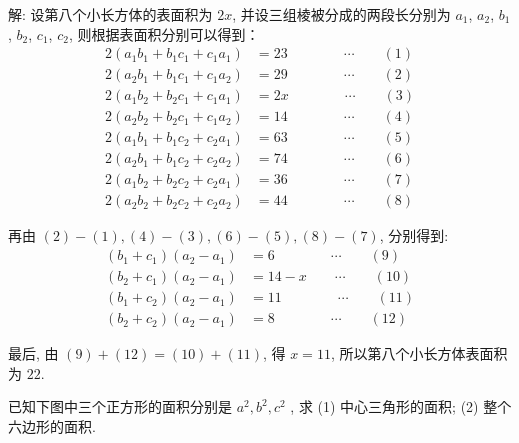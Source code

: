 解: 设第八个小长方体的表面积为 $2x$, 并设三组棱被分成的两段长分别为 $a_1$, $a_2$, $b_1$, $b_2$, $c_1$, $c_2$, 则根据表面积分别可以得到：
\begin{align*}
2(a_1b_1 + b_1c_1 + c_1a_1) &= 23 \qquad\qquad\cdots\qquad (1)\\
2(a_2b_1 + b_1c_1 + c_1a_2) &= 29 \qquad\qquad\cdots\qquad (2)\\
2(a_1b_2 + b_2c_1 + c_1a_1) &= 2x \qquad\qquad\cdots\qquad (3)\\
2(a_2b_2 + b_2c_1 + c_1a_2) &= 14 \qquad\qquad\cdots\qquad (4)\\
2(a_1b_1 + b_1c_2 + c_2a_1) &= 63 \qquad\qquad\cdots\qquad (5)\\
2(a_2b_1 + b_1c_2 + c_2a_2) &= 74 \qquad\qquad\cdots\qquad (6)\\
2(a_1b_2 + b_2c_2 + c_2a_1) &= 36 \qquad\qquad\cdots\qquad (7)\\
2(a_2b_2 + b_2c_2 + c_2a_2) &= 44 \qquad\qquad\cdots\qquad (8)
\end{align*}

再由 $(2) - (1), (4) - (3), (6) - (5), (8) - (7)$, 分别得到:
\begin{align*}
(b_1+c_1)(a_2-a_1) &= 6 \qquad\qquad\cdots\qquad (9)\\
(b_2+c_1)(a_2-a_1) &= 14-x \qquad\cdots\qquad (10)\\
(b_1+c_2)(a_2-a_1) &= 11 \qquad\qquad\cdots\qquad (11)\\
(b_2+c_2)(a_2-a_1) &= 8 \qquad\qquad\cdots\qquad (12)
\end{align*}

最后, 由 $(9)+(12)=(10)+(11)$, 得 $x=11$, 所以第八个小长方体表面积为 $22$.

\newpage

已知下图中三个正方形的面积分别是 $a^2, b^2, c^2$ , 求 (1) 中心三角形的面积; (2) 整个六边形的面积.

